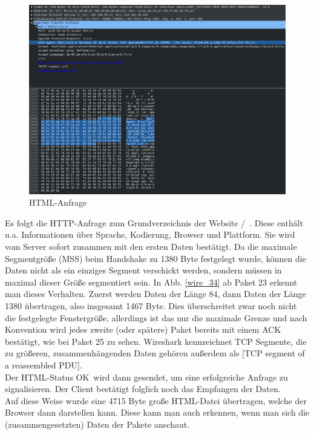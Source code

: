 \documentclass[11pt, a4paper]{article}
\begin{document}
\begin{figure}[H]
  \centering
  \includegraphics[width=\textwidth]{graphics/versuch/3_4/wireshark/http_request}
  \caption{HTML-Anfrage}\label{http_request}
\end{figure}

Es folgt die HTTP-Anfrage zum Grundverzeichnis der Website \glqq /\grqq\ . Diese enthält u.a. Informationen über Sprache, Kodierung, Browser und Plattform. Sie wird vom Server sofort zusammen mit den ersten Daten bestätigt. Da die maximale Segmentgröße (MSS) beim Handshake zu 1380 Byte festgelegt wurde, können die Daten nicht als ein einziges Segment verschickt werden, sondern müssen in maximal dieser Größe segmentiert sein. In Abb. \ref{wire_34} ab Paket 23 erkennt man dieses Verhalten. Zuerst werden Daten der Länge 84, dann Daten der Länge 1380 übertragen, also insgesamt 1467 Byte. Dies überschreitet zwar noch nicht die festgelegte Fenstergröße, allerdings ist das nur die maximale Grenze und nach Konvention wird jedes zweite (oder spätere) Paket bereits mit einem ACK bestätigt, wie bei Paket 25 zu sehen. Wireshark kennzeichnet TCP Segmente, die zu größeren, zusammenhängenden Daten gehören außerdem als [TCP segment of a reassembled PDU].\\

Der HTML-Status  OK\grqq\ wird dann gesendet, um eine erfolgreiche Anfrage zu signalisieren. Der Client bestätigt folglich noch das Empfangen der Daten.\\

Auf diese Weise wurde eine 4715 Byte große HTML-Datei übertragen, welche der Browser dann darstellen kann. Diese kann man auch erkennen, wenn man sich die (zusammengesetzten) Daten der Pakete anschaut.\\
\end{document}
